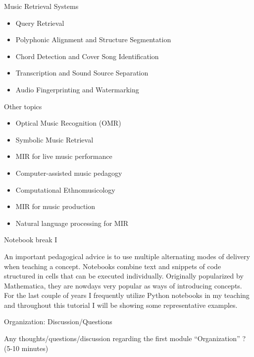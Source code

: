 \documentclass[12pt]{beamer}
\begin{document}
\begin{frame}{Music Retrieval Systems}

  \begin{itemize}
  \item Query Retrieval 
  \item Polyphonic Alignment and Structure Segmentation 
  \item Chord Detection and Cover Song Identification
  \item Transcription and Sound Source Separation
  \item Audio Fingerprinting and Watermarking
    \end{itemize} 

\end{frame} 


\begin{frame}{Other topics}
  \begin{itemize}
  \item{Optical Music Recognition (OMR)}
  \item{Symbolic Music Retrieval}
  \item{MIR for live music performance}
  \item{Computer-assisted music pedagogy}
  \item{Computational Ethnomusicology}
  \item{MIR for music production}
  \item{Natural language processing for MIR} 
  \end{itemize} 

\end{frame}


\begin{frame}{Notebook break I}

  An important pedagogical advice is to use multiple alternating modes
  of delivery when teaching a concept. Notebooks combine text and
  snippets of code structured in cells that can be executed
  individually. Originally popularized by Mathematica, they are
  nowdays very popular as ways of introducing concepts. For the last
  couple of years I frequently utilize Python notebooks in my teaching
  and throughout this tutorial I will be showing some representative
  examples.
\end{frame}

\begin{frame}{Organization: Discussion/Questions}

  Any thoughts/questions/discussion regarding the first module ``Organization'' ? (5-10 minutes) 
  
\end{frame}
\end{document}
